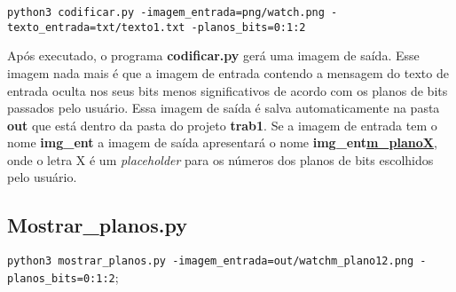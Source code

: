 \documentclass{article}
\begin{document}
\lstinline{python3 codificar.py -imagem_entrada=png/watch.png -texto_entrada=txt/texto1.txt -planos_bits=0:1:2} 

\noindent
Após executado, o programa \textbf{codificar.py} gerá uma imagem de saída. Esse imagem nada mais é que a imagem de entrada contendo a mensagem do texto de entrada oculta nos seus bits menos significativos de acordo com os planos de bits passados pelo usuário. Essa imagem de saída é salva automaticamente na pasta \textbf{out} que está dentro da pasta do projeto \textbf{trab1}. Se a imagem de entrada tem o nome \textbf{img\_ent} a imagem de saída apresentará o nome \textbf{img\_ent\underline{m\_planoX}}, onde o letra X é um \textit{placeholder} para os números dos planos de bits escolhidos pelo usuário.

\subsection{Mostrar\_planos.py}
\lstinline{python3 mostrar_planos.py -imagem_entrada=out/watchm_plano12.png -planos_bits=0:1:2};
\end{document}

